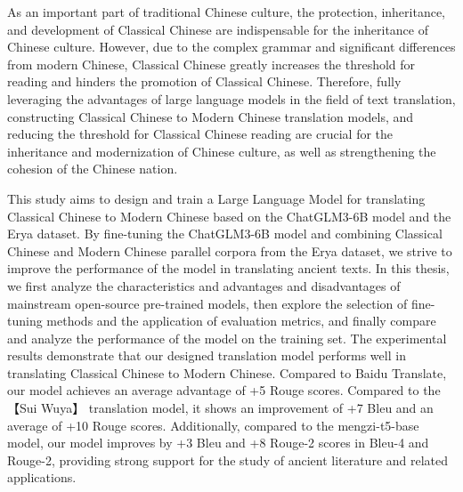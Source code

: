 \documentclass[
    decl-page,  %
    ,fontset = win, %
  ]{njuthesis}
\begin{document}
\begin{abstract*}
As an important part of traditional Chinese culture, the protection, inheritance, and development of Classical Chinese are indispensable for the inheritance of Chinese culture. However, due to the complex grammar and significant differences from modern Chinese, Classical Chinese greatly increases the threshold for reading and hinders the promotion of Classical Chinese. Therefore, fully leveraging the advantages of large language models in the field of text translation, constructing Classical Chinese to Modern Chinese translation models, and reducing the threshold for Classical Chinese reading are crucial for the inheritance and modernization of Chinese culture, as well as strengthening the cohesion of the Chinese nation.

This study aims to design and train a Large Language Model for translating Classical Chinese to Modern Chinese based on the ChatGLM3-6B model and the Erya dataset. By fine-tuning the ChatGLM3-6B model and combining Classical Chinese and Modern Chinese parallel corpora from the Erya dataset, we strive to improve the performance of the model in translating ancient texts. In this thesis, we first analyze the characteristics and advantages and disadvantages of mainstream open-source pre-trained models, then explore the selection of fine-tuning methods and the application of evaluation metrics, and finally compare and analyze the performance of the model on the training set. The experimental results demonstrate that our designed translation model performs well in translating Classical Chinese to Modern Chinese. Compared to Baidu Translate, our model achieves an average advantage of +5 Rouge scores. Compared to the 【Sui Wuya】 translation model, it shows an improvement of +7 Bleu and an average of +10 Rouge scores. Additionally, compared to the mengzi-t5-base model, our model improves by +3 Bleu and +8 Rouge-2 scores in Bleu-4 and Rouge-2, providing strong support for the study of ancient literature and related applications.
\end{abstract*}

\tableofcontents
\listoffigures
\listoftables

\mainmatter

\end{document}

